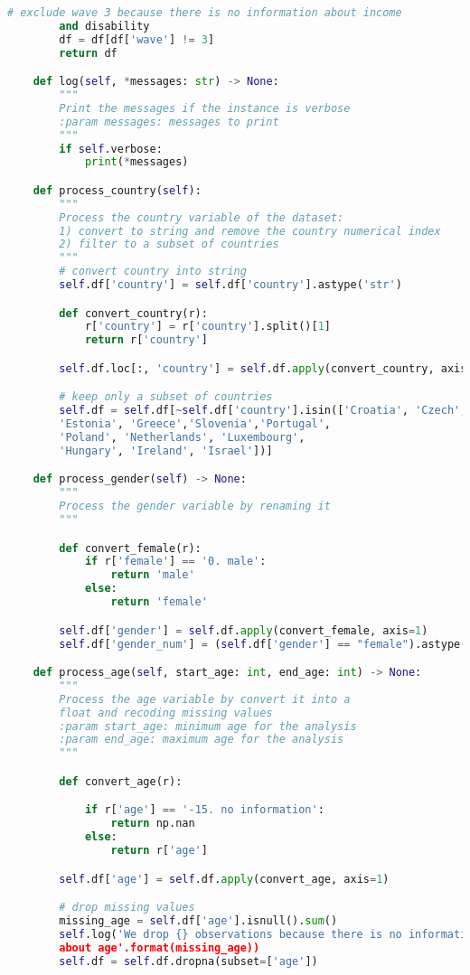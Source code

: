 \begin{lstlisting}[language=Python]
        # exclude wave 3 because there is no information about income
        and disability
        df = df[df['wave'] != 3]
        return df

    def log(self, *messages: str) -> None:
        """
        Print the messages if the instance is verbose
        :param messages: messages to print
        """
        if self.verbose:
            print(*messages)

    def process_country(self):
        """
        Process the country variable of the dataset:
        1) convert to string and remove the country numerical index
        2) filter to a subset of countries
        """
        # convert country into string
        self.df['country'] = self.df['country'].astype('str')

        def convert_country(r):
            r['country'] = r['country'].split()[1]
            return r['country']

        self.df.loc[:, 'country'] = self.df.apply(convert_country, axis=1)

        # keep only a subset of countries
        self.df = self.df[~self.df['country'].isin(['Croatia', 'Czech',
        'Estonia', 'Greece','Slovenia','Portugal', 
        'Poland', 'Netherlands', 'Luxembourg', 
        'Hungary', 'Ireland', 'Israel'])]

    def process_gender(self) -> None:
        """
        Process the gender variable by renaming it
        """

        def convert_female(r):
            if r['female'] == '0. male':
                return 'male'
            else:
                return 'female'

        self.df['gender'] = self.df.apply(convert_female, axis=1)
        self.df['gender_num'] = (self.df['gender'] == "female").astype(int)

    def process_age(self, start_age: int, end_age: int) -> None:
        """
        Process the age variable by convert it into a
        float and recoding missing values
        :param start_age: minimum age for the analysis
        :param end_age: maximum age for the analysis
        """

        def convert_age(r):

            if r['age'] == '-15. no information':
                return np.nan
            else:
                return r['age']

        self.df['age'] = self.df.apply(convert_age, axis=1)

        # drop missing values
        missing_age = self.df['age'].isnull().sum()
        self.log('We drop {} observations because there is no information
        about age'.format(missing_age))
        self.df = self.df.dropna(subset=['age'])


\end{lstlisting}
